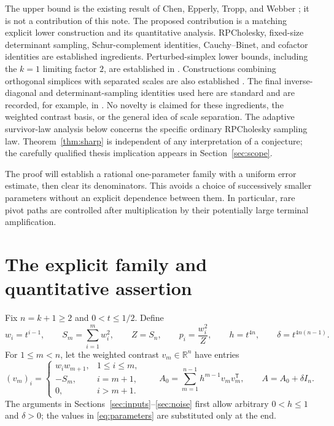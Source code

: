 \documentclass[10pt,letterpaper]{article}
\newcommand{\R}{\mathbb R}
\begin{document}
The upper bound is the existing result of Chen, Epperly, Tropp, and Webber
\cite[Lemma~5.5]{CETW}; it is not a contribution of this note.
The proposed contribution is a matching explicit lower construction and
its quantitative analysis. RPCholesky, fixed-size determinant sampling,
Schur-complement identities, Cauchy--Binet, and cofactor identities are
established ingredients. Perturbed-simplex lower bounds, including the
$k=1$ limiting factor $2$, are established in \cite[Proposition~3.3]{DRVW}.
Constructions combining orthogonal simplices with separated scales are
also established \cite[Section~3]{DKM}. The final inverse-diagonal and
determinant-sampling identities used here are standard and are recorded,
for example, in \cite[Section~4.2]{Simons}. No novelty is claimed for
these ingredients, the weighted contrast basis, or the general idea of
scale separation. The adaptive survivor-law analysis below concerns the
specific ordinary RPCholesky sampling law.
Theorem~\ref{thm:sharp} is independent of any interpretation of a
conjecture; the carefully qualified thesis implication appears in
Section~\ref{sec:scope}.

The proof will establish a rational one-parameter family with a uniform
error estimate, then clear its denominators. This avoids a choice of
successively smaller parameters without an explicit dependence between
them. In particular, rare pivot paths are controlled after multiplication
by their potentially large terminal amplification.

\section{The explicit family and quantitative assertion}

Fix $n=k+1\geq2$ and $0<t\leq1/2$. Define
\begin{equation}\label{eq:parameters}
 w_i=t^{i-1},\qquad S_m=\sum_{i=1}^m w_i^2,\qquad
 Z=S_n,\qquad p_i=\frac{w_i^2}{Z},\qquad
 h=t^{4n},\qquad \delta=t^{4n(n-1)}.
\end{equation}
For $1\leq m<n$, let the weighted contrast $v_m\in\R^n$ have entries
\begin{equation}\label{eq:vectors}
 (v_m)_i=\begin{cases}
 w_iw_{m+1},&1\leq i\leq m,\\
 -S_m,&i=m+1,\\
 0,&i>m+1.
 \end{cases}
 \qquad
 A_0=\sum_{m=1}^{n-1}h^{m-1}v_mv_m^{\mathsf T},\qquad
 A=A_0+\delta I_n.
\end{equation}
The arguments in Sections~\ref{sec:inputs}--\ref{sec:noise} first allow
arbitrary $0<h\leq1$ and $\delta>0$; the values in
\eqref{eq:parameters} are substituted only at the end.
\end{document}

